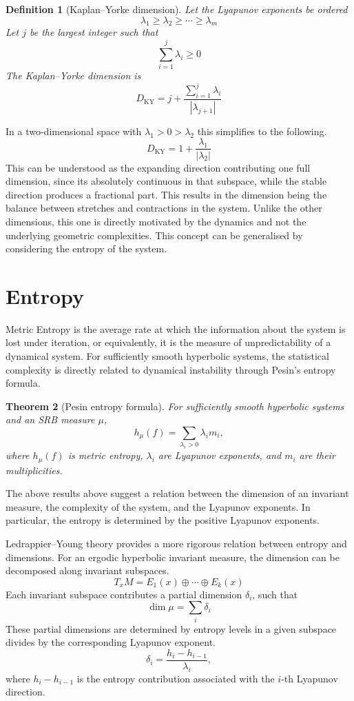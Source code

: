 \documentclass[11pt,a4paper]{article}
\newtheorem{theorem}{Theorem}[section]
\newtheorem{definition}[theorem]{Definition}
\begin{document}
\begin{definition}[Kaplan--Yorke dimension]
	Let the Lyapunov exponents be ordered
	\[
		\lambda_1\geq \lambda_2\geq\cdots\geq \lambda_m
	\]
	Let \(j\) be the largest integer such that
	\[
		\sum_{i=1}^j \lambda_i \geq 0
	\]
	The Kaplan--Yorke dimension is
	\[
		D_{\mathrm{KY}}
		= j+\frac{\sum_{i=1}^j\lambda_i}{|\lambda_{j+1}|}
	\]
\end{definition}
\noindent In a two-dimensional space with \(\lambda_1 > 0 > \lambda_2\) this simplifies to the following.
\[
	D_{\mathrm{KY}} = 1 + \frac{\lambda _1}{|\lambda _2|}
\]
This can be understood as the expanding direction contributing one full dimension, since its absolutely continuous in that subspace, while the stable direction produces a fractional part. This results in the dimension being the balance between stretches and contractions in the system. Unlike the other dimensions, this one is directly motivated by the dynamics and not the underlying geometric complexities. This concept can be generalised by considering the entropy of the system.

\section{Entropy}

Metric Entropy is the average rate at which the information about the system is lost under iteration, or equivalently, it is the measure of unpredictability of a dynamical system.
For sufficiently smooth hyperbolic systems, the statistical complexity is directly related to dynamical instability through Pesin's entropy formula.
\begin{theorem}[Pesin entropy formula]
	For sufficiently smooth hyperbolic systems and an SRB measure \(\mu\),
	\[
		h_\mu(f)=\sum_{\lambda_i>0}\lambda_i m_i,
	\]
	where \(h_\mu(f)\) is metric entropy, \(\lambda_i\) are Lyapunov exponents, and \(m_i\) are their multiplicities.
\end{theorem}
The above results above suggest a relation between the dimension of an invariant measure, the complexity of the system, and the Lyapunov exponents. In particular, the entropy is determined by the positive Lyapunov exponents.

Ledrappier--Young theory provides a more rigorous relation between entropy and dimensions. For an ergodic hyperbolic invariant measure, the dimension can be decomposed along invariant subspaces.
\[
	T_xM = E_1(x)\oplus\cdots\oplus E_k(x)
\]
Each invariant subspace contributes a partial dimension \(\delta_i\), such that
\[
	\dim \mu = \sum_i \delta_i
\]
These partial dimensions are determined by entropy levels in a given subspace divides by the corresponding Lyapunov exponent.
\[
	\delta_i = \frac{h_i-h_{i-1}}{\lambda_i},
\]
where \(h_i-h_{i-1}\) is the entropy contribution associated with the \(i\)-th Lyapunov direction.
\end{document}
